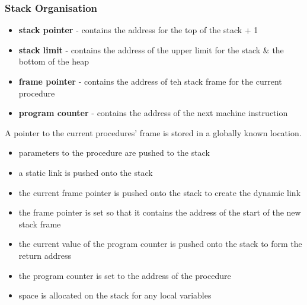 \subsubsection{Stack Organisation}
\begin{itemize}
    \item \textbf{stack pointer} - contains the address for the top of the stack + 1
    \item \textbf{stack limit} - contains the address of the upper limit for the stack 
    \& the bottom of the heap
    \item \textbf{frame pointer} - contains the address of teh stack frame for the 
    current procedure
    \item \textbf{program counter} - contains the address of the next machine instruction
\end{itemize}

A pointer to the current procedures' frame is stored in a globally known location.
{
    \setlength{\columnseprule}{0pt}
    \begin{multicols}{2}
    \begin{itemize}
        \item parameters to the procedure are pushed to the stack
        \item a static link is pushed onto the stack
        \item the current frame pointer is pushed onto the stack to create the dynamic link
        \item the frame pointer is set so that it contains the address of the start of the 
        new stack frame
    \end{itemize}
        \columnbreak
    \begin{center}
    \end{center}
    \end{multicols}
    \begin{itemize}
        \item the current value of the program counter is pushed onto the stack to form the 
        return address
        \item the program counter is set to the address of the procedure
        \item space is allocated on the stack for any local variables
    \end{itemize}
}

